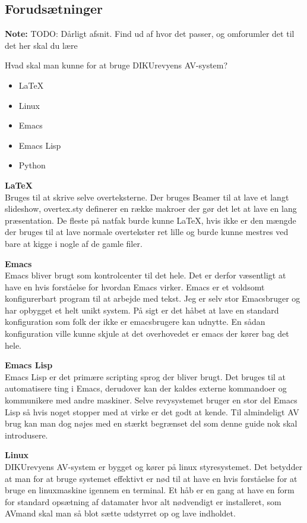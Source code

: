 \documentclass[10pt,a4paper,danish]{article}
\newcommand{\note}[1]{\begin{mdframed}[style=note]\textbf{Note:}
    #1\end{mdframed}}
\begin{document}
\subsection{Forudsætninger}
\note{TODO: Dårligt afsnit. Find ud af hvor det passer, og omforumler det til
  det her skal du lære}

Hvad skal man kunne for at bruge DIKUrevyens AV-system?

\begin{itemize}
\item \LaTeX
\item Linux
\item Emacs
\item Emacs Lisp
\item Python
\end{itemize}

\textbf{\LaTeX}\\
Bruges til at skrive selve overteksterne. Der bruges Beamer til at lave et langt
slideshow, overtex.sty definerer en række makroer der gør det let at lave en
lang præsentation.
De fleste på natfak burde kunne \LaTeX, hvis ikke er den mængde der bruges til
at lave normale overtekster ret lille og burde kunne mestres ved bare at kigge i
nogle af de gamle filer.

\textbf{Emacs}\\
Emacs bliver brugt som kontrolcenter til det hele.
Det er derfor væsentligt at have en hvis forståelse for hvordan Emacs virker.
Emacs er et voldsomt konfigurerbart program til at arbejde med tekst.
Jeg er selv stor Emacsbruger og har opbygget et helt unikt system.
På sigt er det håbet at lave en standard konfiguration som folk der ikke er
emacsbrugere kan udnytte. En sådan konfiguration ville kunne skjule at det
overhovedet er emacs der kører bag det hele.

\textbf{Emacs Lisp}\\
Emacs Lisp er det primære scripting sprog der bliver brugt.
Det bruges til at automatisere ting i Emacs, derudover kan der kaldes externe
kommandoer og kommunikere med andre maskiner.
Selve revysystemet bruger en stor del Emacs Lisp så hvis noget stopper med at
virke er det godt at kende. Til almindeligt AV brug kan man dog nøjes med en
stærkt begrænset del som denne guide nok skal introdusere.

\textbf{Linux}\\
DIKUrevyens AV-system er bygget og kører på linux styresystemet.
Det betydder at man for at bruge systemet effektivt er nød til at have en hvis
forståelse for at bruge en linuxmaskine igennem en terminal.
Et håb er en gang at have en form for standard opsætning af datamater hvor alt
nødvendigt er installeret, som AVmand skal man så blot sætte udstyrret op og
lave indholdet.
\end{document}
